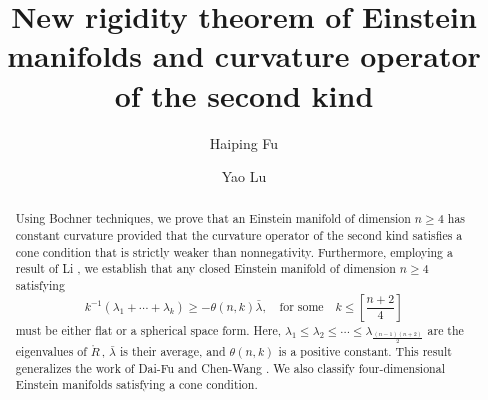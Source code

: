 \documentclass[11pt, reqno]{amsart}
\author{Haiping Fu}
\author{Yao Lu}
\numberwithin{equation}{section}
\theoremstyle{definition}
\begin{document}
	\newcommand{\Ext}{\bigwedge\nolimits}
	\newcommand{\Div}{\operatorname{div}}
	\newcommand{\Hol} {\operatorname{Hol}}
	\newcommand{\diam} {\operatorname{diam}}
	\newcommand{\Scal} {\operatorname{Scal}}
	\newcommand{\scal} {\operatorname{scal}}
	\newcommand{\Ric} {\operatorname{Ric}}
	\newcommand{\Hess} {\operatorname{Hess}}
	\newcommand{\grad} {\operatorname{grad}}
	\newcommand{\Rm} {\operatorname{Rm}}
	\newcommand{ \Rmzero } {\mathring{\Rm}}
	\newcommand{\Rc} {\operatorname{Rc}}
	\newcommand{\Curv} {S_{B}^{2}\left( \mathfrak{so}(n) \right) }
	\newcommand{ \tr } {\operatorname{tr}}
	\newcommand{ \Riczero } {\mathring{\Ric}}
	\newcommand{ \Ad } {\operatorname{Ad}}
	\newcommand{ \dist } {\operatorname{dist}}
	\newcommand{ \rank } {\operatorname{rank}}
	\newcommand{\Vol}{\operatorname{Vol}}
	\newcommand{\dVol}{\operatorname{dVol}}
	\newcommand{ \zitieren }[1]{ \hspace{-3mm} \cite{#1}}
	\newcommand{ \pr }{\operatorname{pr}}
	\newcommand{\diag}{\operatorname{diag}}
	\newcommand{\Lagr}{\mathcal{L}}
	\newcommand{\av}{\operatorname{av}}
	\newcommand{ \floor }[1]{ \lfloor #1 \rfloor }
	\newcommand{ \ceil }[1]{ \lceil #1 \rceil }
	\newcommand{\Sym} {\operatorname{Sym}}
	\newcommand{\bcirc}{ \ \bar{\circ} \ }
	\newcommand{\sign}[1]{\operatorname{sign}(#1)}
	\newcommand{\cone}{\operatorname{cone}}
	\newcommand{\pbd}{\varphi_{bar}^{\delta}}
	\newcommand{\End}{\operatorname{End}}
	
	\renewcommand{\labelenumi}{(\alph{enumi})}
	\newtheorem{maintheorem}{Theorem}[]
	\renewcommand*{\themaintheorem}{\Alph{maintheorem}}
	\newtheorem*{remark*}{Remark}
	
	
	\vspace*{-1cm}
	
	
	\title{New rigidity theorem of Einstein manifolds and curvature operator of the second kind}
	\begin{abstract}
		Using Bochner techniques, we prove that an  Einstein manifold of dimension $n \ge 4$ has constant curvature provided that the curvature operator of the second kind satisfies a cone condition that is strictly weaker than nonnegativity. Furthermore, employing a result of Li \cite{Li5}, we establish that any closed Einstein manifold of dimension $n \ge 4$ satisfying
		\[k^{-1}({\lambda }_1+\cdots +{\lambda }_k)\ge -\theta(n,k) \bar{\lambda },\quad \text{for some} \quad k  \le [\frac{n+2}{4}]\]
		must be either flat or a spherical space form. Here, ${\lambda }_1\le {\lambda }_2\le \cdots \le {\lambda }_{\frac{(n-1)(n+2)}{2}}$
		are the eigenvalues of $\mathring{R}\,$, $\bar{\lambda }$ is their average, and $\theta (n,k)$ is a positive constant. This result generalizes the work of Dai-Fu \cite{DF} and Chen-Wang \cite{CW1,CW}. We also classify four-dimensional Einstein manifolds satisfying a cone condition.
	\end{abstract}
	\maketitle
	
\end{document}
